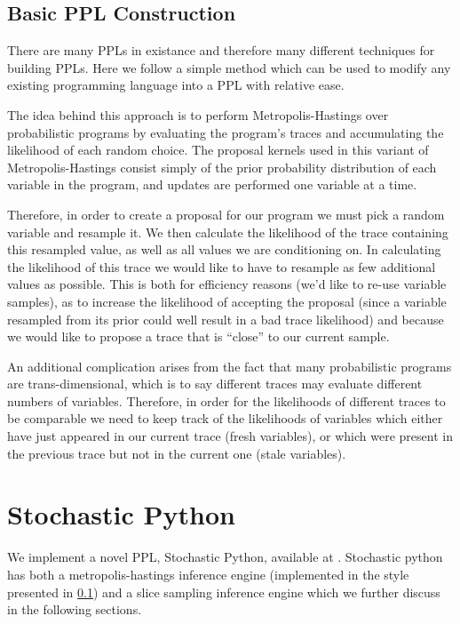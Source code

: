 \subsection{Basic PPL Construction}
\label{pplBack}
There are many PPLs in existance and therefore many different techniques for building PPLs. Here we follow a simple method which can be used to modify any existing programming language into a PPL with relative ease. 

The idea behind this approach is to perform Metropolis-Hastings over probabilistic programs by evaluating the program's traces and accumulating the likelihood of each random choice. The proposal kernels used in this variant of Metropolis-Hastings consist simply of the prior probability distribution of each variable in the program, and updates are performed one variable at a time.

Therefore, in order to create a proposal for our program we must pick a random variable and resample it. We then calculate the likelihood of the trace containing this resampled value, as well as all values we are conditioning on. In calculating the likelihood of this trace we would like to have to resample as few additional values as possible. This is both for efficiency reasons (we'd like to re-use variable samples), as to increase the likelihood of accepting the proposal (since a variable resampled from its prior could well result in a bad trace likelihood) and because we would like to propose a trace that is ``close'' to our current sample.

An additional complication arises from the fact that many probabilistic programs are trans-dimensional, which is to say different traces may evaluate different numbers of variables. Therefore, in order for the likelihoods of different traces to be comparable we need to keep track of the likelihoods of variables which either have just appeared in our current trace (fresh variables), or which were present in the previous trace but not in the current one (stale variables). 

\section{Stochastic Python}
\label{sect:StocPy}
We implement a novel PPL, Stochastic Python, available at . Stochastic python has both a metropolis-hastings inference engine (implemented in the style presented in \ref{pplBack}) and a slice sampling inference engine which we further discuss in the following sections.


